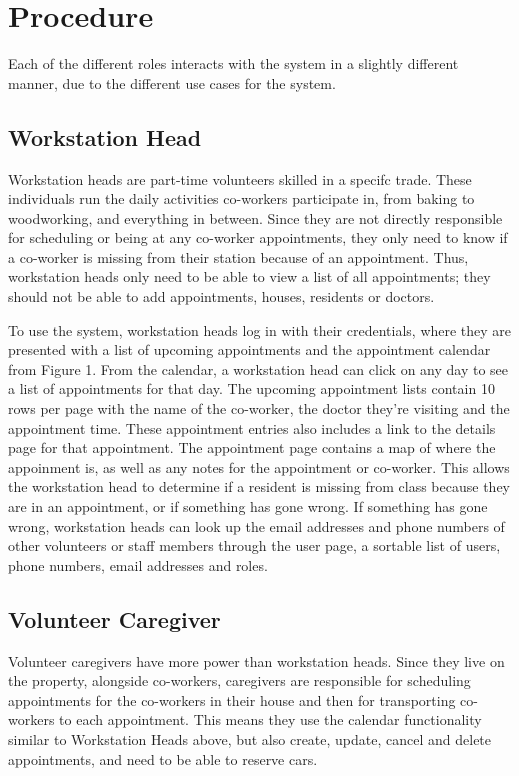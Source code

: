 \documentclass{sig-alternate}
\begin{document}
\section{Procedure}
Each of the different roles interacts with the system in a slightly different manner, due to the different use cases for the system.

\subsection{Workstation Head}
Workstation heads are part-time volunteers skilled in a specifc trade. These individuals run the daily activities co-workers participate in, from baking to woodworking, and everything in between. Since they are not directly responsible for scheduling or being at any co-worker appointments, they only need to know if a co-worker is missing from their station because of an appointment. Thus, workstation heads only need to be able to view a list of all appointments; they should not be able to add appointments, houses, residents or doctors.

To use the system, workstation heads log in with their credentials, where they are presented with a list of upcoming appointments and the appointment calendar from Figure 1. From the calendar, a workstation head can click on any day to see a list of appointments for that day. The upcoming appointment lists contain 10 rows per page with the name of the co-worker, the doctor they're visiting and the appointment time. These appointment entries also includes a link to the details page for that appointment. The appointment page contains a map of where the appoinment is, as well as any notes for the appointment or co-worker. This allows the workstation head to determine if a resident is missing from class because they are in an appointment, or if something has gone wrong. If something has gone wrong, workstation heads can look up the email addresses and phone numbers of other volunteers or staff members through the user page, a sortable list of users, phone numbers, email addresses and roles.

\subsection{Volunteer Caregiver}
Volunteer caregivers have more power than workstation heads. Since they live on the property, alongside co-workers, caregivers are responsible for scheduling appointments for the co-workers in their house and then for transporting co-workers to each appointment. This means they use the calendar functionality similar to Workstation Heads above, but also create, update, cancel and delete appointments, and need to be able to reserve cars.
\end{document}

